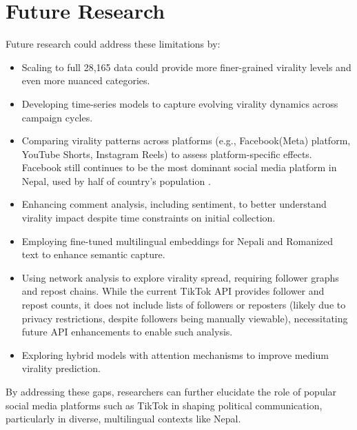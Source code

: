\documentclass[12pt,a4paper]{report}
\begin{document}
\newpage
\section{Future Research}
    Future research could address these limitations by:
    \begin{itemize}
        \item Scaling to full 28,165 data could provide more finer-grained virality levels and even more nuanced categories.
        \item Developing time-series models to capture evolving virality dynamics across campaign cycles.
        \item Comparing virality patterns across platforms (e.g., Facebook(Meta) platform, YouTube Shorts, Instagram Reels) to assess platform-specific effects. Facebook still continues to be the most dominant social media platform in Nepal, used by half of country's population \parencite{napoleoncat2025}.
        \item Enhancing comment analysis, including sentiment, to better understand virality impact despite time constraints on initial collection.
        \item Employing fine-tuned multilingual embeddings for Nepali and Romanized text to enhance semantic capture.
        \item Using network analysis to explore virality spread, requiring follower graphs and repost chains. While the current TikTok API provides follower and repost counts, it does not include lists of followers or reposters (likely due to privacy restrictions, despite followers being manually viewable), necessitating future API enhancements to enable such analysis.
        \item Exploring hybrid models with attention mechanisms to improve medium virality prediction.
    \end{itemize}

    By addressing these gaps, researchers can further elucidate the role of popular  social media platforms such as TikTok in shaping political communication, particularly in diverse, multilingual contexts like Nepal.
\newpage
\end{document}
